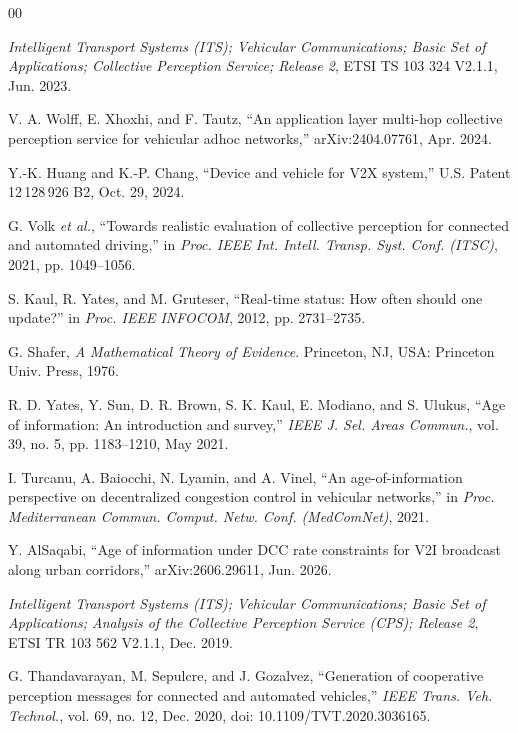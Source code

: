 \documentclass[conference]{IEEEtran}
\begin{document}
\begin{thebibliography}{00}

 \emph{Intelligent Transport Systems (ITS); Vehicular
Communications; Basic Set of Applications; Collective Perception Service;
Release 2}, ETSI TS 103 324 V2.1.1, Jun. 2023.

 V. A. Wolff, E. Xhoxhi, and F. Tautz, ``An application
layer multi-hop collective perception service for vehicular adhoc networks,''
arXiv:2404.07761, Apr. 2024.

 Y.-K. Huang and K.-P. Chang, ``Device and vehicle for V2X
system,'' U.S. Patent 12\,128\,926 B2, Oct. 29, 2024.

 G. Volk \emph{et al.}, ``Towards realistic evaluation of
collective perception for connected and automated driving,'' in \emph{Proc.
IEEE Int. Intell. Transp. Syst. Conf. (ITSC)}, 2021, pp. 1049--1056.

 S. Kaul, R. Yates, and M. Gruteser, ``Real-time status: How
often should one update?'' in \emph{Proc. IEEE INFOCOM}, 2012,
pp. 2731--2735.

 G. Shafer, \emph{A Mathematical Theory of Evidence}.
Princeton, NJ, USA: Princeton Univ. Press, 1976.

 R. D. Yates, Y. Sun, D. R. Brown, S. K. Kaul, E. Modiano,
and S. Ulukus, ``Age of information: An introduction and survey,'' \emph{IEEE
J. Sel. Areas Commun.}, vol. 39, no. 5, pp. 1183--1210, May 2021.

 I. Turcanu, A. Baiocchi, N. Lyamin, and A. Vinel, ``An
age-of-information perspective on decentralized congestion control in
vehicular networks,'' in \emph{Proc. Mediterranean Commun. Comput. Netw. Conf.
(MedComNet)}, 2021.

 Y. AlSaqabi, ``Age of information under DCC rate
constraints for V2I broadcast along urban corridors,'' arXiv:2606.29611,
Jun. 2026.

 \emph{Intelligent Transport Systems (ITS); Vehicular
Communications; Basic Set of Applications; Analysis of the Collective
Perception Service (CPS); Release 2}, ETSI TR 103 562 V2.1.1, Dec. 2019.

 G. Thandavarayan, M. Sepulcre, and J. Gozalvez,
``Generation of cooperative perception messages for connected and automated
vehicles,'' \emph{IEEE Trans. Veh. Technol.}, vol. 69, no. 12, Dec. 2020,
doi: 10.1109/TVT.2020.3036165.


\end{thebibliography}
\end{document}
